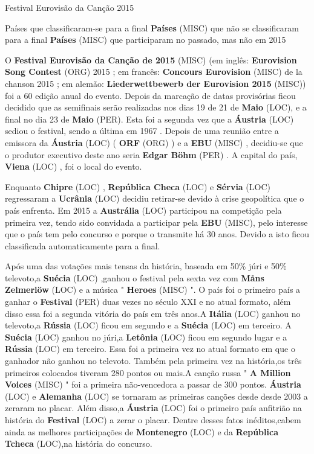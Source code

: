 \documentclass[12pt,a4paper]{article}
\begin{document}
Festival Eurovisão da Canção 2015



Países que classificaram-se para a final \textbf{Países} (MISC) que não se classificaram para a final \textbf{Países} (MISC) que participaram no passado, mas não em 2015

O \textbf{Festival Eurovisão da Canção de 2015} (MISC) (em inglês: \textbf{Eurovision Song Contest} (ORG) 2015 ; em francês: \textbf{Concours Eurovision} (MISC) de la chanson 2015 ; em alemão: \textbf{Liederwettbewerb der Eurovision 2015} (MISC)) foi a 60 edição anual do evento. Depois da marcação de datas provisórias ficou decidido que as semifinais serão realizadas nos dias 19 de 21 de \textbf{Maio} (LOC), e a final no dia 23 de \textbf{Maio} (PER). Esta foi a segunda vez que a \textbf{Áustria} (LOC) sediou o festival, sendo a última em 1967 . Depois de uma reunião entre a emissora da \textbf{Áustria} (LOC) ( \textbf{ORF} (ORG) ) e a \textbf{EBU} (MISC) , decidiu-se que o produtor executivo deste ano seria \textbf{Edgar Böhm} (PER) . A capital do país, \textbf{Viena} (LOC) , foi o local do evento.

Enquanto \textbf{Chipre} (LOC) , \textbf{República Checa} (LOC) e \textbf{Sérvia} (LOC) regressaram a \textbf{Ucrânia} (LOC) decidiu retirar-se devido à crise geopolítica que o país enfrenta. Em 2015 a \textbf{Austrália} (LOC) participou na competição pela primeira vez, tendo sido convidada a participar pela \textbf{EBU} (MISC), pelo interesse que o país tem pelo concurso e porque o transmite há 30 anos. Devido a isto ficou classificada automaticamente para a final.

Após uma das votações mais tensas da história, baseada em 50\% júri e 50\% televoto,a \textbf{Suécia} (LOC) ,ganhou o festival pela sexta vez com \textbf{Måns Zelmerlöw} (LOC) e a música " \textbf{Heroes} (MISC) ". O país foi o primeiro país a ganhar o \textbf{Festival} (PER) duas vezes no século XXI e no atual formato, além disso essa foi a segunda vitória do país em três anos.A \textbf{Itália} (LOC) ganhou no televoto,a \textbf{Rússia} (LOC) ficou em segundo e a \textbf{Suécia} (LOC) em terceiro. A \textbf{Suécia} (LOC) ganhou no júri,a \textbf{Letônia} (LOC) ficou em segundo lugar e a \textbf{Rússia} (LOC) em terceiro. Essa foi a primeira vez no atual formato em que o ganhador não ganhou no televoto. Também pela primeira vez na história,os três primeiros colocados tiveram 280 pontos ou mais.A canção russa " \textbf{A Million Voices} (MISC) " foi a primeira não-vencedora a passar de 300 pontos. \textbf{Áustria} (LOC) e \textbf{Alemanha} (LOC) se tornaram as primeiras canções desde desde 2003 a zeraram no placar. Além disso,a \textbf{Áustria} (LOC) foi o primeiro país anfitrião na história do \textbf{Festival} (LOC) a zerar o placar. Dentre desses fatos inéditos,cabem ainda as melhores participações de \textbf{Montenegro} (LOC) e da \textbf{República Tcheca} (LOC),na história do concurso.
\end{document}
